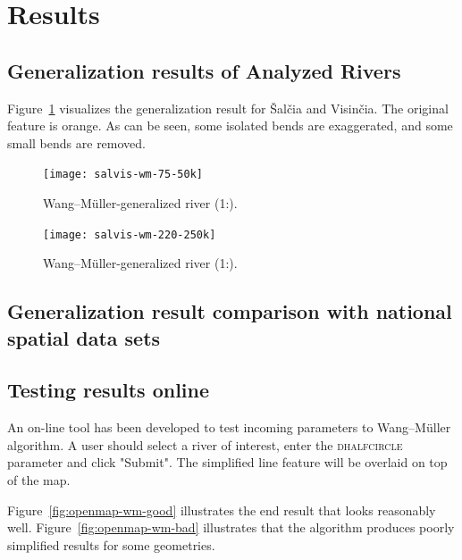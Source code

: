\documentclass[a4paper]{article}
\newcommand{\WM}{Wang--M{\"u}ller}
\begin{document}
\section{Results}

\subsection{Generalization results of Analyzed Rivers}

Figure~\ref{fig:salvis-wm-75-50k} visualizes the generalization result for
Šalčia and Visinčia. The original feature is orange. As can be seen, some
isolated bends are exaggerated, and some small bends are removed.

\begin{figure}[ht]
    \centering
    \texttt{[image: salvis-wm-75-50k]}
    \caption{{\WM}-generalized river (1:{}).}
    \label{fig:salvis-wm-75-50k}
\end{figure}

\begin{figure}[ht]
    \centering
    \texttt{[image: salvis-wm-220-250k]}
    \caption{{\WM}-generalized river (1:{}).}
    \label{fig:salvis-wm-220-250k}
\end{figure}

\clearpage

\subsection{Generalization result comparison with national spatial data sets}


\subsection{Testing results online}
\label{sec:testing-results-online}

An on-line tool\cite{openmapwm} has been developed to test incoming parameters
to {\WM} algorithm. A user should select a river of interest, enter the
\textsc{dhalfcircle} parameter and click "Submit". The simplified line feature
will be overlaid on top of the map.

Figure~\ref{fig:openmap-wm-good} illustrates the end result that looks
reasonably well. Figure~\ref{fig:openmap-wm-bad} illustrates that the algorithm
produces poorly simplified results for some geometries.
\end{document}
